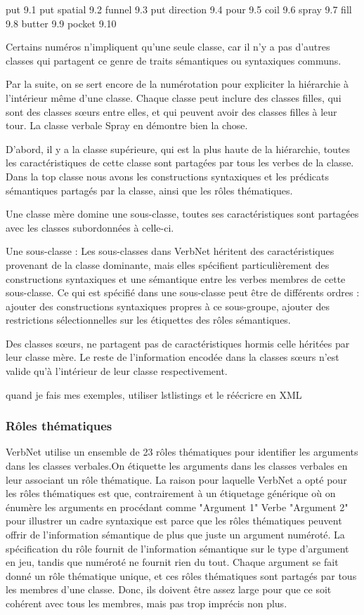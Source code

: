 put 9.1
put spatial 9.2
funnel 9.3
put direction 9.4
pour 9.5
coil 9.6
spray 9.7
fill 9.8
butter 9.9
pocket 9.10

Certains numéros n'impliquent qu'une seule classe, car il n'y a pas d'autres classes qui partagent ce genre de traits sémantiques ou syntaxiques communs.

Par la suite, on se sert encore de la numérotation pour expliciter la hiérarchie à l'intérieur même d'une classe. Chaque classe peut inclure des classes filles, qui sont des classes sœurs entre elles, et qui peuvent avoir des classes filles à leur tour. La classe verbale Spray en démontre bien la chose. 

D'abord, il y a la classe supérieure, qui est la plus haute de la hiérarchie, toutes les caractéristiques de cette classe sont partagées par tous les verbes de la classe. Dans la top classe nous avons les constructions syntaxiques et les prédicats sémantiques partagés par la classe, ainsi que les rôles thématiques. 

Une classe mère domine une sous-classe, toutes ses caractéristiques sont partagées avec les classes subordonnées à celle-ci. 

Une sous-classe : Les sous-classes dans VerbNet héritent des caractéristiques provenant de la classe dominante, mais elles spécifient particulièrement des constructions syntaxiques et une sémantique entre les verbes membres de cette sous-classe. Ce qui est spécifié dans une sous-classe peut être de différents ordres : ajouter des constructions syntaxiques propres à ce sous-groupe, ajouter des restrictions sélectionnelles sur les étiquettes des rôles sémantiques. 

Des classes sœurs, ne partagent pas de caractéristiques hormis celle héritées par leur classe mère. Le reste de l'information encodée dans la classes sœurs n'est valide qu'à l'intérieur de leur classe respectivement.

quand je fais mes exemples, utiliser lstlistings et le réécricre en XML

\subsubsection{Rôles thématiques}

VerbNet utilise un ensemble de 23 rôles thématiques pour identifier les arguments dans les classes verbales.On étiquette les arguments dans les classes verbales en leur associant un rôle thématique. La raison pour laquelle VerbNet a opté pour les rôles thématiques est que, contrairement à un étiquetage générique où on énumère les arguments en procédant comme "Argument 1" Verbe "Argument 2" pour illustrer un cadre syntaxique est parce que les rôles thématiques peuvent offrir de l'information sémantique de plus que juste un argument numéroté. La spécification du rôle fournit de l'information sémantique sur le type d'argument en jeu, tandis que numéroté ne fournit rien du tout. Chaque argument se fait donné un rôle thématique unique, et ces rôles thématiques sont partagés par tous les membres d'une classe. Donc, ils doivent être assez large pour que ce soit cohérent avec tous les membres, mais pas trop imprécis non plus.

